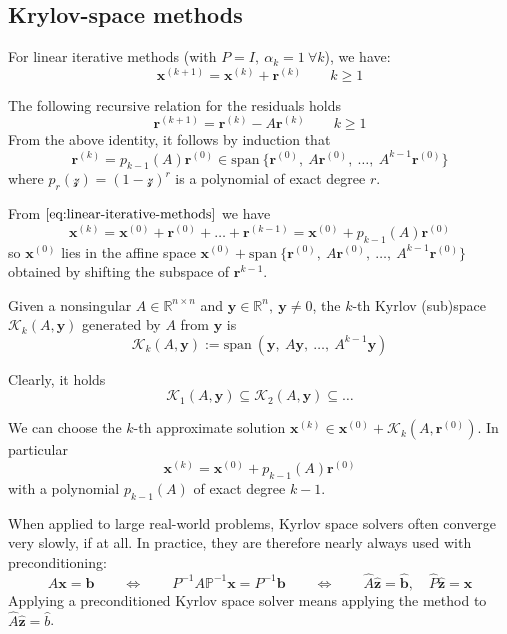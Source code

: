 \subsection{Krylov-space methods}

For linear iterative methods (with $P = I, \ \alpha_{k} = 1 \ \forall k$), we have:
\begin{equation}
    \label{eq:linear-iterative-methods}
    \mathbf{x}^{(k+1)} = \mathbf{x}^{(k)} + \mathbf{r}^{(k)} \qquad k \geq 1
\end{equation}

The following recursive relation for the residuals holds
$$
    \mathbf{r}^{(k+1)} = \mathbf{r}^{(k)} - A \mathbf{r}^{(k)} \qquad k \geq 1
$$
From the above identity, it follows by induction that
$$
    \mathbf{r}^{(k)} = p_{k-1} (A) \mathbf{r}^{(0)} \in \mathrm{span} \ \{\mathbf{r}^{(0)}, \ A \mathbf{r}^{(0)}, \ \dots, \ A^{k-1} \mathbf{r}^{(0)} \}
$$
where $p_{r}(\mathscr z) = (1 - \mathscr z)^{r}$ is a polynomial of exact degree $r$.

From $\eqref{eq:linear-iterative-methods}$ we have
$$
    \mathbf{x}^{(k)} = \mathbf{x}^{(0)} + \mathbf{r}^{(0)} + \dots + \mathbf{r}^{(k-1)} = \mathbf{x}^{(0)} + p_{k-1}(A) \mathbf{r}^{(0)}
$$
so $\mathbf{x}^{(0)}$ lies in the affine space $\mathbf{x}^{(0)} + \mathrm{span} \ \{ \mathbf{r}^{(0)}, \ A \mathbf{r}^{(0)}, \ \dots, \ A^{k-1} \mathbf{r}^{(0)} \}$ obtained by shifting the subspace of $\mathbf{r}^{k-1}$.

\begin{tcolorbox}[title=Definition of Krylov (sub)space]
    Given a nonsingular $A\in \mathbb{R}^{n\times n}$ and $\mathbf{y} \in \mathbb{R}^{n}, \ \mathbf{y} \neq 0$, the $k$-th Kyrlov (sub)space $\mathscr K_{k}(A, \mathbf{y})$ generated by $A$ from $\mathbf{y}$ is
    $$
        \mathscr K_{k}(A, \mathbf{y}) := \mathrm{span} \ (\mathbf{y}, \ A \mathbf{y}, \ \dots, \ A^{k-1} \mathbf{y})
    $$
\end{tcolorbox}

Clearly, it holds
$$
    \mathscr K_{1}(A, \mathbf{y}) \subseteq \mathcal K_{2} (A, \mathbf{y}) \subseteq \dots
$$

We can choose the $k$-th approximate solution $\mathbf{x}^{(k)} \in \mathbf{x}^{(0)} + \mathscr K_{k}(A, \mathbf{r}^{(0)})$. In particular
$$
    \mathbf{x}^{(k)} = \mathbf{x}^{(0)} + p_{k-1}(A) \mathbf{r}^{(0)}
$$
with a polynomial $p_{k-1}(A)$ of exact degree $k-1$.

When applied to large real-world problems, Kyrlov space solvers often converge very slowly, if at all. In practice, they are therefore nearly always used with preconditioning:
$$
    A \mathbf{x} = \mathbf{b} \qquad \iff \qquad P^{-1} A \mathbb{P}^{-1}\mathbf{x} = P^{-1} \mathbf{b} \qquad \iff \qquad \hat{A}\hat{\mathbf{z}} = \hat{\mathbf{b}}, \quad \hat{P} \hat{\mathbf{z}} = \mathbf{x}
$$
Applying a preconditioned Kyrlov space solver means applying the method to $\hat{A} \hat{\mathbf{z}} = \hat{b}$.



